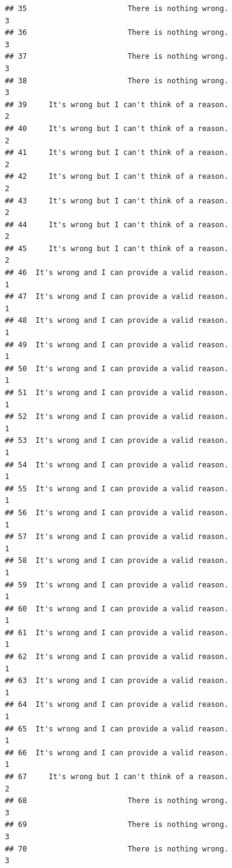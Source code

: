 \documentclass[
  american,
  man,floatsintext]{apa7}
\begin{document}
\begin{verbatim}
## 35                       There is nothing wrong.                    3
## 36                       There is nothing wrong.                    3
## 37                       There is nothing wrong.                    3
## 38                       There is nothing wrong.                    3
## 39     It's wrong but I can't think of a reason.                    2
## 40     It's wrong but I can't think of a reason.                    2
## 41     It's wrong but I can't think of a reason.                    2
## 42     It's wrong but I can't think of a reason.                    2
## 43     It's wrong but I can't think of a reason.                    2
## 44     It's wrong but I can't think of a reason.                    2
## 45     It's wrong but I can't think of a reason.                    2
## 46  It's wrong and I can provide a valid reason.                    1
## 47  It's wrong and I can provide a valid reason.                    1
## 48  It's wrong and I can provide a valid reason.                    1
## 49  It's wrong and I can provide a valid reason.                    1
## 50  It's wrong and I can provide a valid reason.                    1
## 51  It's wrong and I can provide a valid reason.                    1
## 52  It's wrong and I can provide a valid reason.                    1
## 53  It's wrong and I can provide a valid reason.                    1
## 54  It's wrong and I can provide a valid reason.                    1
## 55  It's wrong and I can provide a valid reason.                    1
## 56  It's wrong and I can provide a valid reason.                    1
## 57  It's wrong and I can provide a valid reason.                    1
## 58  It's wrong and I can provide a valid reason.                    1
## 59  It's wrong and I can provide a valid reason.                    1
## 60  It's wrong and I can provide a valid reason.                    1
## 61  It's wrong and I can provide a valid reason.                    1
## 62  It's wrong and I can provide a valid reason.                    1
## 63  It's wrong and I can provide a valid reason.                    1
## 64  It's wrong and I can provide a valid reason.                    1
## 65  It's wrong and I can provide a valid reason.                    1
## 66  It's wrong and I can provide a valid reason.                    1
## 67     It's wrong but I can't think of a reason.                    2
## 68                       There is nothing wrong.                    3
## 69                       There is nothing wrong.                    3
## 70                       There is nothing wrong.                    3

\end{verbatim}
\end{document}
